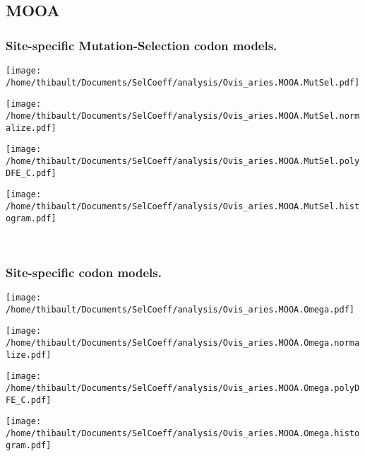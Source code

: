 \subsection{MOOA} 
 
\subsubsection*{Site-specific Mutation-Selection codon models.} 
\begin{minipage}{0.49\linewidth} 
\texttt{[image: /home/thibault/Documents/SelCoeff/analysis/Ovis\_aries.MOOA.MutSel.pdf]} 
\end{minipage}
\begin{minipage}{0.49\linewidth} 
\texttt{[image: /home/thibault/Documents/SelCoeff/analysis/Ovis\_aries.MOOA.MutSel.normalize.pdf]} 
\end{minipage}
\begin{minipage}{0.49\linewidth} 
\texttt{[image: /home/thibault/Documents/SelCoeff/analysis/Ovis\_aries.MOOA.MutSel.polyDFE\_C.pdf]} 
\end{minipage}
\begin{minipage}{0.49\linewidth} 
\texttt{[image: /home/thibault/Documents/SelCoeff/analysis/Ovis\_aries.MOOA.MutSel.histogram.pdf]} 
\end{minipage}
\\ 
\subsubsection*{Site-specific codon models.} 
\begin{minipage}{0.49\linewidth} 
\texttt{[image: /home/thibault/Documents/SelCoeff/analysis/Ovis\_aries.MOOA.Omega.pdf]} 
\end{minipage}
\begin{minipage}{0.49\linewidth} 
\texttt{[image: /home/thibault/Documents/SelCoeff/analysis/Ovis\_aries.MOOA.Omega.normalize.pdf]} 
\end{minipage}
\begin{minipage}{0.49\linewidth} 
\texttt{[image: /home/thibault/Documents/SelCoeff/analysis/Ovis\_aries.MOOA.Omega.polyDFE\_C.pdf]} 
\end{minipage}
\begin{minipage}{0.49\linewidth} 
\texttt{[image: /home/thibault/Documents/SelCoeff/analysis/Ovis\_aries.MOOA.Omega.histogram.pdf]} 
\end{minipage}
\\ 
